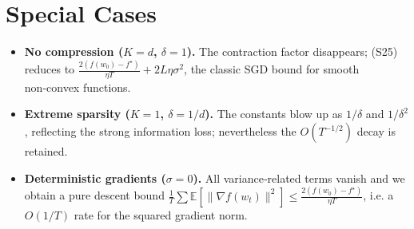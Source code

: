 \documentclass{article}
\newcommand{\E}{\mathbb{E}}
\begin{document}
\section*{Special Cases}
\begin{itemize}
\item \textbf{No compression ($K=d$, $\delta=1$).}
      The contraction factor disappears; (S25) reduces to
      $\frac{2(f(w_0)-f^\star)}{\eta T}+2L\eta\sigma^{2}$,
      the classic SGD bound for smooth non‑convex functions.
\item \textbf{Extreme sparsity ($K=1$, $\delta=1/d$).}
      The constants blow up as $1/\delta$ and $1/\delta^{2}$,
      reflecting the strong information loss; nevertheless the
      $O(T^{-1/2})$ decay is retained.
\item \textbf{Deterministic gradients ($\sigma=0$).}
      All variance‑related terms vanish and we obtain a pure descent
      bound $\frac{1}{T}\sum\E[\|\nabla f(w_t)\|^{2}]
      \le \frac{2(f(w_0)-f^\star)}{\eta T}$,
      i.e. a $O(1/T)$ rate for the squared gradient norm.
\end{itemize}
\end{document}
